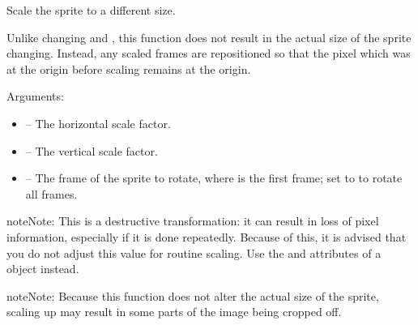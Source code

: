\documentclass[letterpaper,10pt,english]{sphinxmanual}
\begin{document}

\begin{fulllineitems}
\label{gfx:sge.gfx.Sprite.scale}
Scale the sprite to a different size.

Unlike changing {\hyperref[gfx:sge.gfx.Sprite.width]{\emph{}}} and {\hyperref[gfx:sge.gfx.Sprite.height]{\emph{}}}, this function
does not result in the actual size of the sprite changing.
Instead, any scaled frames are repositioned so that the pixel
which was at the origin before scaling remains at the origin.

Arguments:
\begin{itemize}
\item {} 
 -- The horizontal scale factor.

\item {} 
 -- The vertical scale factor.

\item {} 
 -- The frame of the sprite to rotate, where  is
the first frame; set to  to rotate all frames.

\end{itemize}

\begin{notice}{note}{Note:}
This is a destructive transformation: it can result in loss
of pixel information, especially if it is done repeatedly.
Because of this, it is advised that you do not adjust this
value for routine scaling.  Use the  and
 attributes of a {\hyperref[dsp:sge.dsp.Object]{\emph{}}}
object instead.
\end{notice}

\begin{notice}{note}{Note:}
Because this function does not alter the actual size of the
sprite, scaling up may result in some parts of the image
being cropped off.
\end{notice}

\end{fulllineitems}

\end{document}

